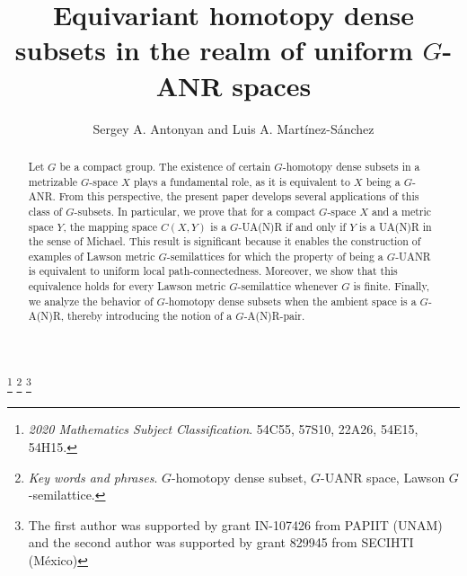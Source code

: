 \documentclass[12pt]{amsart}
\theoremstyle{definition}
\begin{document}
	
	
	
	\title{Equivariant homotopy dense subsets in the realm of uniform $G$-ANR spaces}
	
		\author{Sergey A. Antonyan and  Luis A. Mart\'inez-Sánchez
		\\[3pt] }
	
	\address{Departamento de  Matem\'aticas,
		Facultad de Ciencias, Universidad Nacional Aut\'onoma de M\'exico,
		04510, Mexico City,  Mexico}
	
	
	\address{Departamento de  Matem\'aticas,
		Facultad de Ciencias, Universidad Nacional Aut\'onoma de M\'exico,
		04510, Mexico City,  Mexico}
	
	
	\thanks {{\it 2020 Mathematics Subject Classification}. 54C55, 57S10, 22A26, 54E15,  54H15.}
	\thanks{{\it  Key words and phrases}. $G$-homotopy dense subset, $G$-UANR space, Lawson $G$-semilattice.}
	\thanks{The first author was supported  by grant IN-107426 from PAPIIT (UNAM) and the second author was supported by grant 829945 from SECIHTI (M\'exico)}
	\begin{abstract} 
	
		Let $G$ be a compact group. The existence of certain $G$-homotopy dense subsets in a metrizable $G$-space $X$ plays a fundamental role, as it is equivalent to $X$ being a $G$-ANR. From this perspective, the present paper develops several applications of this class of $G$-subsets.
		In particular, we prove that for a compact $G$-space $X$ and a metric space $Y$, the mapping space $C(X,Y)$ is a $G$-UA(N)R if and only if $Y$ is a UA(N)R in the sense of Michael. This result is significant because it enables the construction of examples of Lawson metric $G$-semilattices for which the property of being a $G$-UANR is equivalent to uniform local path-connectedness. Moreover, we show that this equivalence holds for every Lawson metric $G$-semilattice whenever $G$ is finite.
		Finally, we analyze the behavior of $G$-homotopy dense subsets when the ambient space is a $G$-A(N)R, thereby introducing the notion of a $G$-A(N)R-pair.
	\end{abstract}
	
	\maketitle{}
	
\end{document}
